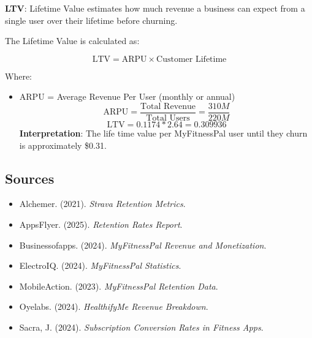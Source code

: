 \documentclass[
]{article}
\providecommand{\tightlist}{%
  \setlength{\itemsep}{0pt}\setlength{\parskip}{0pt}}
\begin{document}
\textbf{LTV}: Lifetime Value estimates how much revenue a business can
expect from a single user over their lifetime before churning.

The Lifetime Value is calculated as:

\[
\text{LTV} = \text{ARPU} \times \text{Customer Lifetime}
\]

Where:

\begin{itemize}
\tightlist
\item
  \(\text{ARPU}\) = Average Revenue Per User (monthly or annual)\\
  \[
  \text{ARPU} = \frac{\text{Total Revenue}}{\text{Total Users}} = \frac{310M}{220M}
  \] \[
  \text{LTV} = 0.1174*2.64=0.309936
  \] \textbf{Interpretation}: The life time value per MyFitnessPal user
  until they churn is approximately \$0.31.
\end{itemize}

\subsection{Sources}\label{sources}

\begin{itemize}
\tightlist
\item
  Alchemer. (2021). \emph{Strava Retention Metrics}.\\
\item
  AppsFlyer. (2025). \emph{Retention Rates Report}.\\
\item
  Businessofapps. (2024). \emph{MyFitnessPal Revenue and
  Monetization}.\\
\item
  ElectroIQ. (2024). \emph{MyFitnessPal Statistics}.\\
\item
  MobileAction. (2023). \emph{MyFitnessPal Retention Data}.\\
\item
  Oyelabs. (2024). \emph{HealthifyMe Revenue Breakdown}.\\
\item
  Sacra, J. (2024). \emph{Subscription Conversion Rates in Fitness
  Apps}.
\end{itemize}
\end{document}
